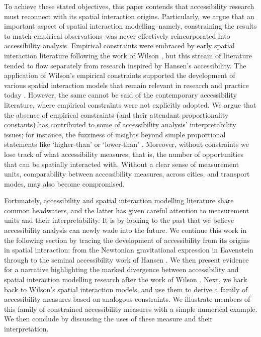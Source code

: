\documentclass[
  10pt,
  letterpaper,
]{article}
\begin{document}
To achieve these stated objectives, this paper contends that
accessibility research must reconnect with its spatial interaction
origins. Particularly, we argue that an important aspect of spatial
interaction modelling--namely, constraining the results to match
empirical observations--was never effectively reincorporated into
accessibility analysis. Empirical constraints were embraced by early
spatial interaction literature following the work of Wilson
\citep{wilson1971}, but this stream of literature tended to flow
separately from research inspired by Hansen's \citep{hansen1959}
accessibility. The application of Wilson's \citep{wilson1971} empirical
constraints supported the development of various spatial interaction
models that remain relevant in research and practice today
\citep{ortuzar_2011_modelling}. However, the same cannot be said of the
contemporary accessibility literature, where empirical constraints were
not explicitly adopted. We argue that the absence of empirical
constraints (and their attendant proportionality constants) has
contributed to some of accessibility analysis' interpretability issues;
for instance, the fuzziness of insights beyond simple proportional
statements like `higher-than' or `lower-than'
\citep{millerAccessibilityMeasurementApplication2018}. Moreover, without
constraints we lose track of what accessibility measures, that is, the
number of opportunities that can be spatially interacted with. Without a
clear sense of measurement units, comparability between accessibility
measures, across cities, and transport modes, may also become
compromised.

Fortunately, accessibility and spatial interaction modelling literature
share common headwaters, and the latter has given careful attention to
measurement units and their interpretability. It is by looking to the
past that we believe accessibility analysis can newly wade into the
future. We continue this work in the following section by tracing the
development of accessibility from its origins in spatial interaction:
from the Newtonian gravitational expression in Eavenstein
\citep{ravensteinLawsMigration1889} through to the seminal accessibility
work of Hansen \citep{hansen1959}. We then present evidence for a
narrative highlighting the marked divergence between accessibility and
spatial interaction modelling research after the work of Wilson
\citep{wilson1971}. Next, we hark back to Wilson's \citep{wilson1971}
spatial interaction models, and use them to derive a family of
accessibility measures based on analogous constraints. We illustrate
members of this family of constrained accessibility measures with a
simple numerical example. We then conclude by discussing the uses of
these measure and their interpretation.
\end{document}
